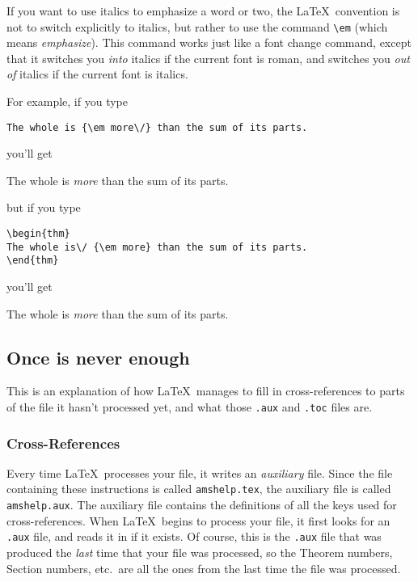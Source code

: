 If you want to use italics to emphasize a word or two, the \LaTeX\
convention is not to switch explicitly to  italics, but rather to use
the command \verb"\em" (which means {\em emphasize\/}).  This command
works just like a font change command, except that it switches you
{\em into\/} italics if the current font is roman, and switches you
{\em out of\/} italics if the current font is italics.

For example, if you type
\begin{center}
\verb"The whole is {\em more\/} than the sum of its parts."
\end{center}
you'll get
\begin{center}
The whole is {\em more\/} than the sum of its parts.
\end{center}
but if you type
\begin{verbatim}
\begin{thm}
The whole is\/ {\em more} than the sum of its parts.
\end{thm}
\end{verbatim}
you'll get
\begin{thm}
The whole is\/ {\em more} than the sum of its parts.
\end{thm}





\subsection{Once is never enough}

This is an explanation of how \LaTeX\ manages to fill in
cross-references to parts of the file it hasn't processed yet, and
what those \verb".aux" and \verb".toc" files are.


\subsubsection*{Cross-References}

Every time \LaTeX\ processes your file, it writes an {\em auxiliary\/}
file.  Since the file containing these instructions is called
\verb"amshelp.tex", the auxiliary file is called \verb"amshelp.aux".
The auxiliary file contains the definitions of all the keys
used for cross-references.  When \LaTeX\ begins to process your
file, it first looks for an \verb".aux" file, and reads it in if
it exists.  Of course, this is the \verb".aux" file that was produced
the {\em last \/} time that your file was processed, so the Theorem
numbers, Section numbers, etc.\ are all the ones from the last time
the file was processed.

